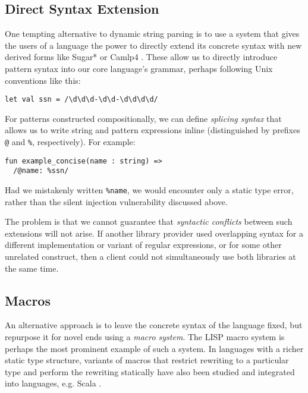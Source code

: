 \documentclass[preprint]{sigplanconf}
\begin{document}
\subsection{Direct Syntax Extension}\label{sec:syntax-extension}
One tempting alternative to dynamic string parsing is to use a system that gives the users of a language the power to directly extend its concrete syntax with new derived forms like  Sugar* \cite{erdweg2013framework} or Camlp4 \cite{OCaml-manual}. These allow us to directly introduce pattern syntax into our core language's grammar, perhaps following Unix conventions like this:
\begin{lstlisting}[numbers=none]
let val ssn = /\d\d\d-\d\d-\d\d\d\d/
\end{lstlisting}

For patterns constructed compositionally, we can define \emph{splicing syntax} that allows us to write string and pattern expressions inline (distinguished by prefixes \lstinline{@} and \lstinline{%}, respectively). 
For example:
\begin{lstlisting}[numbers=none,escapechar=|]
fun example_concise(name : string) => 
  /@name: %ssn/
\end{lstlisting}
Had we mistakenly written \lstinline{%name}, we would encounter only a static type error, rather than the  silent injection  vulnerability discussed above. 

The problem is that we cannot guarantee that \emph{syntactic conflicts} between such extensions will not arise. If another library provider used overlapping syntax for a different implementation or variant of regular expressions, or for some other unrelated construct, then a client could not simultaneously use both libraries at the same time.

\subsection{Macros}\label{sec:term-rewriting}
An alternative approach is to leave the concrete syntax of the language fixed, but repurpose it for novel ends using a \emph{macro system}. The LISP macro system \cite{Hart63a} is perhaps the most prominent example of such a system. %
In languages with a richer static type structure, variants of macros that restrict rewriting to a particular type and perform the rewriting statically have also been studied \cite{Herman10:Theory,ganz2001macros} and integrated into languages, e.g. Scala \cite{ScalaMacros2013}. 
\end{document}
